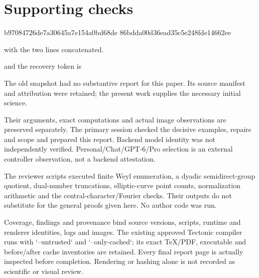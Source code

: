 \documentclass[10pt]{article}
\begin{document}
\section*{Supporting checks}
b97084726de7a30645a7e154a0bd68de
86bdda00d36ead35c5e248fde14662ee\par
with the two lines concatenated.\par
and the recovery token is\par
The old snapshot had no substantive report for this paper. Its source manifest and attribution were retained; the present work supplies the necessary initial science.\par
Their arguments, exact computations and actual image observations are preserved separately. The primary session checked the decisive examples, repairs and scope and prepared this report. Backend model identity was not independently verified. Personal/Chat/GPT-6/Pro selection is an external controller observation, not a backend attestation.\par
The reviewer scripts executed finite Weyl enumeration, a dyadic semidirect-group quotient, dual-number truncations, elliptic-curve point counts, normalization arithmetic and the central-character/Fourier checks. Their outputs do not substitute for the general proofs given here. No author code was run.\par
Coverage, findings and provenance bind source versions, scripts, runtime and renderer identities, logs and images. The existing approved Tectonic compiler runs with `–untrusted` and `–only-cached`; its exact TeX/PDF, executable and before/after cache inventories are retained. Every final report page is actually inspected before completion. Rendering or hashing alone is not recorded as scientific or visual review.\par
\end{document}

